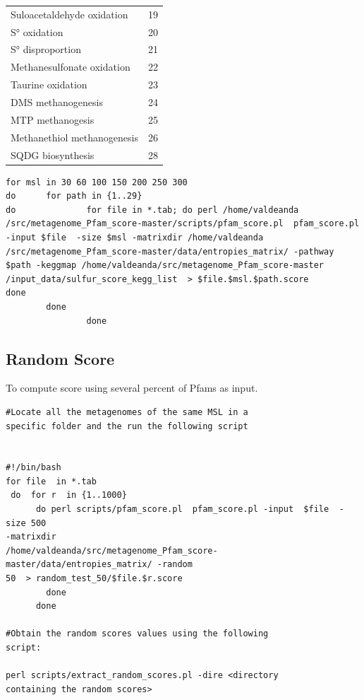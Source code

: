\documentclass[12pt]{report}
\begin{document}
\begin{table}[H]
\begin{tabular}{@{}lc@{}}
Suloacetaldehyde oxidation  & 19     \\
S° oxidation                & 20     \\
S° disproportion            & 21     \\
Methanesulfonate oxidation  & 22     \\
Taurine oxidation           & 23     \\
DMS methanogenesis          & 24     \\
MTP methanogesis            & 25     \\
Methanethiol methanogenesis & 26     \\
SQDG biosynthesis           & 28     \\ \bottomrule
\end{tabular}
\end{table}

\begin{verbatim}
for msl in 30 60 100 150 200 250 300   
do      for path in {1..29}
do              for file in *.tab; do perl /home/valdeanda
/src/metagenome_Pfam_score-master/scripts/pfam_score.pl  pfam_score.pl 
-input $file  -size $msl -matrixdir /home/valdeanda
/src/metagenome_Pfam_score-master/data/entropies_matrix/ -pathway 
$path -keggmap /home/valdeanda/src/metagenome_Pfam_score-master
/input_data/sulfur_score_kegg_list  > $file.$msl.$path.score 
done
        done
                done
\end{verbatim}
\subsection{Random Score}

To compute score  using several percent of Pfams as input. 

\begin{verbatim}
#Locate all the metagenomes of the same MSL in a 
specific folder and the run the following script  


#!/bin/bash
for file  in *.tab
 do  for r  in {1..1000}
      do perl scripts/pfam_score.pl  pfam_score.pl -input  $file  -size 500
-matrixdir
/home/valdeanda/src/metagenome_Pfam_score-master/data/entropies_matrix/ -random
50  > random_test_50/$file.$r.score
        done
      done

#Obtain the random scores values using the following 
script: 

perl scripts/extract_random_scores.pl -dire <directory 
containing the random scores>
     


\end{verbatim}
\end{document}
